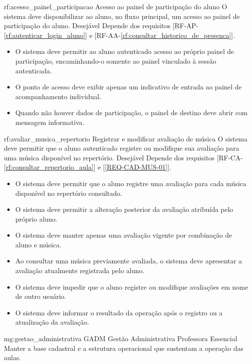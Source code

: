 \reqfuncprio
{rf:acesso_painel_participacao}
{Acesso ao painel de participação do aluno}
{O sistema deve disponibilizar ao aluno, no fluxo principal, um acesso ao painel de participação do aluno.}
{Desejável}
{Depende dos requisitos [RF-AP-\ref{rf:autenticar_login_aluno}] e [RF-AA-\ref{rf:consultar_historico_de_presenca}].}
{\begin{itemize}[leftmargin=0.6cm]
    \item O sistema deve permitir ao aluno autenticado acesso ao próprio painel de participação, encaminhando-o somente ao painel vinculado à sessão autenticada.
    \item O ponto de acesso deve exibir apenas um indicativo de entrada ao painel de acompanhamento individual.
    \item Quando não houver dados de participação, o painel de destino deve abrir com mensagem informativa.
\end{itemize}}

\reqfuncprio
{rf:avaliar_musica_repertorio}
{Registrar e modificar avaliação de música}
{O sistema deve permitir que o aluno autenticado registre ou modifique sua avaliação para uma música disponível no repertório.}
{Desejável}
{Depende dos requisitos [RF-CA-\ref{rf:consultar_repertorio_aula}] e [\ref{REQ-CAD-MUS-01}].}
{\begin{itemize}[leftmargin=0.6cm]
    \item O sistema deve permitir que o aluno registre uma avaliação para cada música disponível no repertório consultado.
    \item O sistema deve permitir a alteração posterior da avaliação atribuída pelo próprio aluno.
    \item O sistema deve manter apenas uma avaliação vigente por combinação de aluno e música.
    \item Ao consultar uma música previamente avaliada, o sistema deve apresentar a avaliação atualmente registrada pelo aluno.
    \item O sistema deve impedir que o aluno registre ou modifique avaliações em nome de outro usuário.
    \item O sistema deve informar o resultado da operação após o registro ou a atualização da avaliação.
\end{itemize}}



\rfmacrogrupo
{mg:gestao_administrativa}
{GADM}
{Gestão Administrativa}
{Professora}
{Essencial}
{Manter a base cadastral e a estrutura operacional que sustentam a operação das aulas.}


